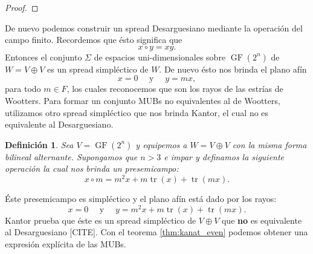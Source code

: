 \documentclass[a4paper]{report}
\DeclareMathOperator{\tr}{tr}
\DeclareMathOperator{\GF}{GF}
\newtheorem{definition}{Definición}
\begin{document}
\begin{proof}
  \end{proof}
  
  De nuevo podemos construir un spread Desarguesiano
  mediante la operación del campo finito. Recordemos que
  ésto significa que
  \[
    x \circ y = xy.
  \] 
  Entonces el conjunto $\Sigma$ de espacios
  uni-dimensionales sobre $\GF(2^{n})$ de $W = V \oplus V$
  es un spread simpléctico de $W$. De nuevo ésto nos brinda
  el plano afín
  \[
    x = 0
    \quad \text{ y } \quad
    y = mx,
  \]
  para todo $m \in F$, los cuales reconocemos que son los
  rayos de las estrías de Wootters. Para formar un conjunto
  MUBs no equivalentes al de Wootters, utilizamos otro
  spread simpléctico que nos brinda Kantor, el cual no es
  equivalente al Desarguesiano.
  \begin{definition}
    \label{def:kantor_even_alt}
    Sea $V = \GF(2^{n})$ y equipemos a $W = V \oplus V$ con
    la misma forma bilineal alternante. Supongamos que $n >
    3$ e impar y definamos la siguiente operación la cual
    nos brinda un presemicampo:
    \begin{equation}
      x \circ m
      = m^2x + m\tr(x) + \tr(mx).
    \end{equation}
  \end{definition}
  Éste presemicampo es simpléctico y el plano afín está dado
  por los rayos: 
  \begin{equation}
    \label{eqn:qubit_alt_spread}
    x = 0
    \quad \text{ y } \quad
    y = m^2x + m\tr(x) + \tr(mx).
  \end{equation}
  Kantor prueba que éste es un spread simpléctico de $V
  \oplus V$ que \textbf{no} es equivalente al Desarguesiano
  [CITE]. Con el teorema \ref{thm:kanat_even} podemos
  obtener una expresión explícita de las MUBs.
\end{document}
